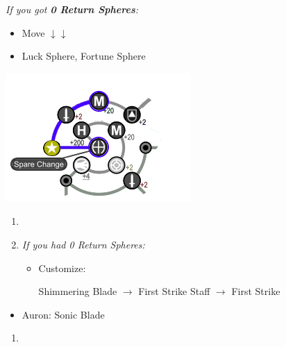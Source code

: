 \begin{spheregrid}
\begin{itemize}
\begin{itemize}
\begin{multicols}{2}
				\item \textit{If you got \textbf{0 Return Spheres}:}
				      \begin{itemize}
					      \item Move $\downarrow\downarrow$
					      \item Luck Sphere, Fortune Sphere
				      \end{itemize}
				      \includegraphics{graphics/0_return_w_luck}
			\end{multicols}
		\end{itemize}
	\end{itemize}
\end{spheregrid}
\begin{enumerate}[resume]
	\item \formation{\tidus}{\auron}{\yuna}

	\item \textit{If you had 0 Return Spheres:}
	      \begin{itemize}
		      \item Customize:
		            \begin{itemize}
			            \auronf Shimmering Blade $\rightarrow$ First Strike
			            \yunaf Staff $\rightarrow$ First Strike
		            \end{itemize}
	      \end{itemize}
\end{enumerate}
\begin{equip}
	\begin{itemize}
		\item Auron: Sonic Blade
	\end{itemize}
\end{equip}
\begin{enumerate}[resume]
	\item {\large \save}
\end{enumerate}
